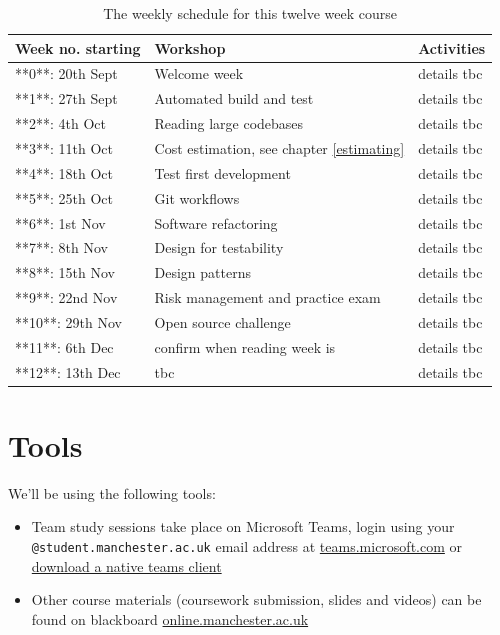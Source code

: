 \documentclass[
]{book}
\providecommand{\tightlist}{%
  \setlength{\itemsep}{0pt}\setlength{\parskip}{0pt}}
\begin{document}
\begin{table}

\caption{\label{tab:schedtable}The weekly schedule for this twelve week course }
\centering
\begin{tabular}[t]{lll}
\toprule
Week no. starting & Workshop & Activities\\
\midrule
**0**: 20th Sept & Welcome week & details tbc\\
**1**: 27th Sept & Automated build and test & details tbc\\
**2**: 4th Oct & Reading large codebases & details tbc\\
**3**: 11th Oct & Cost estimation, see chapter \ref{estimating} & details tbc\\
**4**: 18th Oct & Test first development & details tbc\\
\addlinespace
**5**: 25th Oct & Git workflows & details tbc\\
**6**: 1st Nov & Software refactoring & details tbc\\
**7**: 8th Nov & Design for testability & details tbc\\
**8**: 15th Nov & Design patterns & details tbc\\
**9**: 22nd Nov & Risk management and practice exam & details tbc\\
\addlinespace
**10**: 29th Nov & Open source challenge & details tbc\\
**11**: 6th Dec & confirm when reading week is & details tbc\\
**12**: 13th Dec & tbc & details tbc\\
\bottomrule
\end{tabular}
\end{table}

\hypertarget{tooling}{%
\section{Tools}\label{tooling}}

We'll be using the following tools:

\begin{itemize}
\tightlist
\item
  Team study sessions take place on Microsoft Teams, login using your \texttt{@student.manchester.ac.uk} email address at \href{https://teams.microsoft.com/}{teams.microsoft.com} or \href{https://www.microsoft.com/en-gb/microsoft-teams/download-app}{download a native teams client}
\item
  Other course materials (coursework submission, slides and videos) can be found on blackboard \href{https://online.manchester.ac.uk/}{online.manchester.ac.uk}
\end{itemize}
\end{document}
